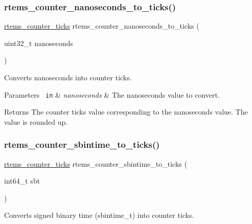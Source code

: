 \subsubsection{\texorpdfstring{rtems\_counter\_nanoseconds\_to\_ticks()}{rtems\_counter\_nanoseconds\_to\_ticks()}}
{\footnotesize\ttfamily \mbox{\hyperlink{group__ClassicCounter_gafda796220404920ac0af841d9f555262}{rtems\+\_\+counter\+\_\+ticks}} rtems\+\_\+counter\+\_\+nanoseconds\+\_\+to\+\_\+ticks (\begin{DoxyParamCaption}\item[{uint32\+\_\+t}]{nanoseconds }\end{DoxyParamCaption})}



Converts nanoseconds into counter ticks. 


\begin{DoxyParams}[1]{Parameters}
\mbox{\texttt{ in}}  & {\em nanoseconds} & The nanoseconds value to convert.\\
\hline
\end{DoxyParams}
\begin{DoxyReturn}{Returns}
The counter ticks value corresponding to the nanoseconds value. The value is rounded up. 
\end{DoxyReturn}
\mbox{\label{group__ClassicCounter_ga2cc1e89d4abdd736de597533ee747187}} 
\subsubsection{\texorpdfstring{rtems\_counter\_sbintime\_to\_ticks()}{rtems\_counter\_sbintime\_to\_ticks()}}
{\footnotesize\ttfamily \mbox{\hyperlink{group__ClassicCounter_gafda796220404920ac0af841d9f555262}{rtems\+\_\+counter\+\_\+ticks}} rtems\+\_\+counter\+\_\+sbintime\+\_\+to\+\_\+ticks (\begin{DoxyParamCaption}\item[{int64\+\_\+t}]{sbt }\end{DoxyParamCaption})}



Converts signed binary time (sbintime\+\_\+t) into counter ticks. 


